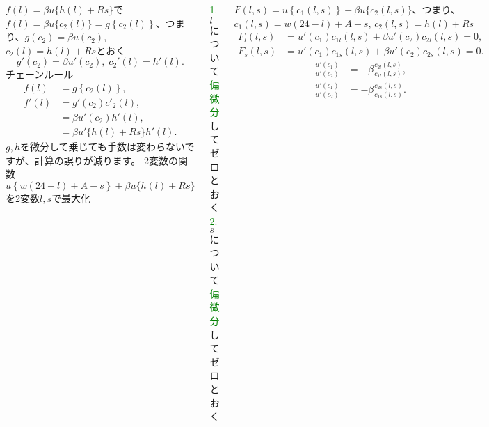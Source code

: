 \begin{frame}[t]{}
\begin{columns}[T]
$f(l)=\beta u\{h(l)+Rs\}$で$f(l)=\beta u\{c_{2}(l)\}=g\left\{c_{2}(l)\right\}$、つまり、$g(c_{2})=\beta u(c_{2})$, $c_{2}(l)=h(l)+Rs$とおく
\[
g'(c_{2})=\beta u'(c_{2}), \; c_{2}'(l)=h'(l).
\]
チェーンルール
\[
\begin{aligned}
f(l)
&=
g\left\{c_{2}(l)\right\},\\
f'(l)
&=
g'(c_{2})c'_{2}(l),\\
&=
\beta u'(c_{2})h'(l),\\
&=
\beta u'\{h(l)+Rs\}h'(l).
\end{aligned}
\]
\pause
$g, h$を微分して乗じても手数は変わらないですが、計算の誤りが減ります。
\pause
2変数の関数$u\left\{w(24-l)+A-s\right\}+\beta u\{h(l)+Rs\}$を2変数$l, s$で最大化

\pause
{\tiny \textcolor{green}{1.} $l$について\textcolor{green}{偏微分}してゼロとおく \; \textcolor{green}{2.} $s$について\textcolor{green}{偏微分}してゼロとおく}

\pause
$F(l, s)=u\left\{c_{1}(l, s)\right\}+\beta u\{c_{2}(l, s)\}$、つまり、$c_{1}(l, s)=w(24-l)+A-s$, $c_{2}(l, s)=h(l)+Rs$
\pause
{\small
\[
\begin{aligned}
F_{l}(l, s)
&=
u'\left(c_{1}\right)c_{1l}(l, s)+\beta u'(c_{2})c_{2l}(l, s)=0,\\
F_{s}(l, s)
&=
u'\left(c_{1}\right)c_{1s}(l, s)+\beta u'(c_{2})c_{2s}(l, s)=0.
\end{aligned}
\]
}
\[
\begin{aligned}
\frac{u'\left(c_{1}\right)}{u'\left(c_{2}\right)}&=-\beta \frac{c_{2l}(l, s)}{c_{1l}(l, s)}, \\
\frac{u'\left(c_{1}\right)}{u'\left(c_{2}\right)}&=-\beta \frac{c_{2s}(l, s)}{c_{1s}(l, s)}. 
\end{aligned}
\]
\end{columns}
\end{frame}

